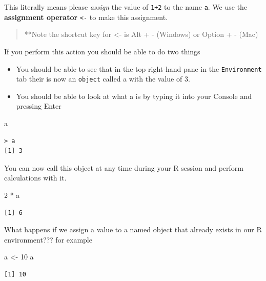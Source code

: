 \documentclass[
]{book}
\newenvironment{Shaded}{\begin{snugshade}}{\end{snugshade}}
\newcommand{\DecValTok}[1]{\textcolor[rgb]{0.00,0.00,0.81}{#1}}
\newcommand{\NormalTok}[1]{#1}
\newcommand{\OtherTok}[1]{\textcolor[rgb]{0.56,0.35,0.01}{#1}}
\newcommand{\SpecialCharTok}[1]{\textcolor[rgb]{0.00,0.00,0.00}{#1}}
\begin{document}
This literally means please \emph{assign} the value of \texttt{1+2} to the name \texttt{a}. We use the \textbf{assignment operator} \texttt{\textless{}-} to make this assignment.

\begin{quote}
**Note the shortcut key for \textless- is Alt + - (Windows) or Option + - (Mac)
\end{quote}

If you perform this action you should be able to do two things

\begin{itemize}
\item
  You should be able to see that in the top right-hand pane in the \texttt{Environment} tab their is now an \texttt{object} called a with the value of 3.
\item
  You should be able to look at what a is by typing it into your Console and pressing Enter
\end{itemize}

\begin{Shaded}
\begin{Highlighting}[]
\NormalTok{a}
\end{Highlighting}
\end{Shaded}

\begin{verbatim}
> a
[1] 3
\end{verbatim}

You can now call this object at any time during your R session and perform calculations with it.

\begin{Shaded}
\begin{Highlighting}[]
\DecValTok{2} \SpecialCharTok{*}\NormalTok{ a}
\end{Highlighting}
\end{Shaded}

\begin{verbatim}
[1] 6
\end{verbatim}

What happens if we assign a value to a named object that already exists in our R environment??? for example

\begin{Shaded}
\begin{Highlighting}[]
\NormalTok{a }\OtherTok{\textless{}{-}} \DecValTok{10}
\NormalTok{a}
\end{Highlighting}
\end{Shaded}

\begin{verbatim}
[1] 10
\end{verbatim}
\end{document}

